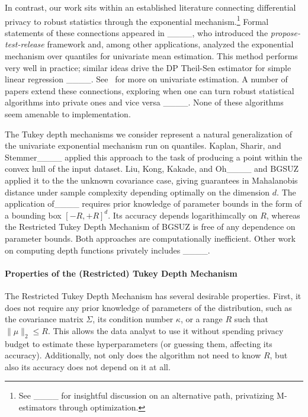 In contrast, our work sits within an established literature connecting differential privacy to robust statistics through the exponential mechanism.\footnote{See  ____ for insightful discussion on an alternative path, privatizing M-estimators through optimization.}
Formal statements of these connections appeared in ____, who introduced the \emph{propose-test-release} framework and, among other applications, analyzed the exponential mechanism over quantiles for univariate mean estimation.
This method performs very well in practice; similar ideas drive the DP Theil-Sen estimator for simple linear regression ____.
See~ for more on univariate estimation.
A number of papers extend these connections, exploring when one can turn robust statistical algorithms into private ones and vice versa ____. 
None of these algorithms seem amenable to implementation.

The Tukey depth mechanisms we consider represent a natural generalization of the univariate exponential mechanism run on quantiles.
Kaplan, Sharir, and Stemmer____ applied this approach to the task of producing a point within the convex hull of the input dataset.
Liu, Kong, Kakade, and Oh____ and BGSUZ applied it to the the unknown covariance case, giving guarantees in Mahalanobis distance under sample complexity depending optimally on the dimension $d$. 
The application of____ requires prior knowledge of parameter bounds in the form of a bounding box $[-R,+R]^d$.
Its accuracy depends logarithimcally on $R$, whereas the Restricted Tukey Depth Mechanism of BGSUZ is free of any dependence on parameter bounds. 
Both approaches are computationally inefficient. 
Other work on computing depth functions privately includes ____. 

\paragraph{Properties of the (Restricted) Tukey Depth Mechanism} The Restricted Tukey Depth Mechanism has several desirable properties.
First, it does not require any prior knowledge of parameters of the distribution, such as the covariance matrix $\Sigma$, its condition number $\kappa$, or a range $R$ such that $\|\mu\|_2\leq R$. 
This allows the data analyst to use it without spending privacy budget to estimate these hyperparameters (or guessing them, affecting its accuracy). 
Additionally, not only does the algorithm not need to know $R$, but also its accuracy does not depend on it at all.

